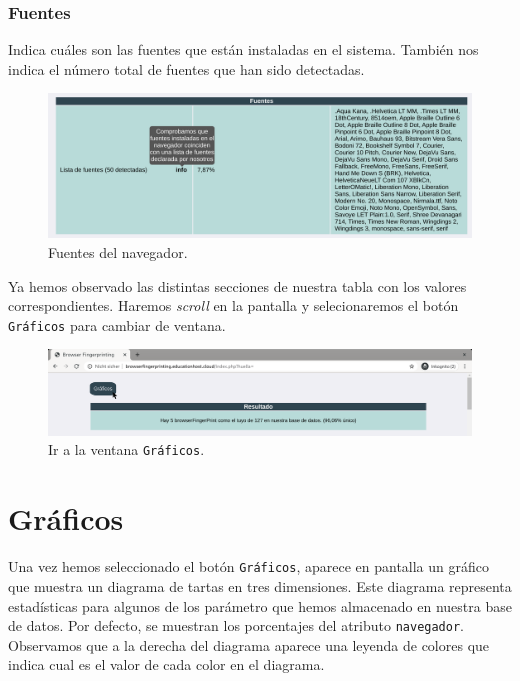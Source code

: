 \subsubsection{Fuentes}
Indica cuáles son las fuentes que están instaladas en el sistema. También nos indica el número total de fuentes que han sido detectadas.

\begin{figure}[H]
	\centering
	\includegraphics[width=1\textwidth]{Images/fuentesSection.png}
	\caption{Fuentes del navegador.}
	\label{fig:fuentesSection}
\end{figure}

Ya hemos observado las distintas secciones de nuestra tabla con los valores correspondientes. Haremos \textit{scroll} en la pantalla y selecionaremos el botón \texttt{Gráficos} para cambiar de ventana.

\begin{figure}[H]
	\centering
	\includegraphics[width=1\textwidth]{Images/graficosBoton.png}
	\caption{Ir a la ventana \texttt{Gráficos}.}
	\label{fig:graficosBoton}
\end{figure}


\section{Gráficos}

Una vez hemos seleccionado el botón \texttt{Gráficos}, aparece en pantalla un gráfico que muestra un diagrama de tartas en tres dimensiones. 
Este diagrama representa estadísticas para algunos de los parámetro que hemos almacenado en nuestra base de datos. Por defecto, se muestran los porcentajes del atributo \texttt{navegador}. Observamos que a la derecha del diagrama aparece una leyenda de colores que indica cual es el valor de cada color en el diagrama. 


